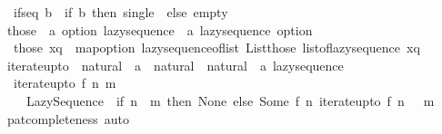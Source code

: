 \begin{isabellebody}
\isanewline
\ \ {\isachardoublequoteopen}if{\isacharunderscore}{\kern0pt}seq\ b\ {\isacharequal}{\kern0pt}\ {\isacharparenleft}{\kern0pt}if\ b\ then\ single\ {\isacharparenleft}{\kern0pt}{\isacharparenright}{\kern0pt}\ else\ empty{\isacharparenright}{\kern0pt}{\isachardoublequoteclose}\isanewline
\isanewline
{}\isamarkupfalse%
\ those\ {\isacharcolon}{\kern0pt}{\isacharcolon}{\kern0pt}\ {\isachardoublequoteopen}{\isacharprime}{\kern0pt}a\ option\ lazy{\isacharunderscore}{\kern0pt}sequence\ {\isasymRightarrow}\ {\isacharprime}{\kern0pt}a\ lazy{\isacharunderscore}{\kern0pt}sequence\ option{\isachardoublequoteclose}\isanewline
{}\isanewline
\ \ {\isachardoublequoteopen}those\ xq\ {\isacharequal}{\kern0pt}\ map{\isacharunderscore}{\kern0pt}option\ lazy{\isacharunderscore}{\kern0pt}sequence{\isacharunderscore}{\kern0pt}of{\isacharunderscore}{\kern0pt}list\ {\isacharparenleft}{\kern0pt}List{\isachardot}{\kern0pt}those\ {\isacharparenleft}{\kern0pt}list{\isacharunderscore}{\kern0pt}of{\isacharunderscore}{\kern0pt}lazy{\isacharunderscore}{\kern0pt}sequence\ xq{\isacharparenright}{\kern0pt}{\isacharparenright}{\kern0pt}{\isachardoublequoteclose}\isanewline
\ \ \isanewline
{}\isamarkupfalse%
\ iterate{\isacharunderscore}{\kern0pt}upto\ {\isacharcolon}{\kern0pt}{\isacharcolon}{\kern0pt}\ {\isachardoublequoteopen}{\isacharparenleft}{\kern0pt}natural\ {\isasymRightarrow}\ {\isacharprime}{\kern0pt}a{\isacharparenright}{\kern0pt}\ {\isasymRightarrow}\ natural\ {\isasymRightarrow}\ natural\ {\isasymRightarrow}\ {\isacharprime}{\kern0pt}a\ lazy{\isacharunderscore}{\kern0pt}sequence{\isachardoublequoteclose}\isanewline
{}\isanewline
\ \ {\isachardoublequoteopen}iterate{\isacharunderscore}{\kern0pt}upto\ f\ n\ m\ {\isacharequal}{\kern0pt}\isanewline
\ \ \ \ Lazy{\isacharunderscore}{\kern0pt}Sequence\ {\isacharparenleft}{\kern0pt}{\isasymlambda}{\isacharunderscore}{\kern0pt}{\isachardot}{\kern0pt}\ if\ n\ {\isachargreater}{\kern0pt}\ m\ then\ None\ else\ Some\ {\isacharparenleft}{\kern0pt}f\ n{\isacharcomma}{\kern0pt}\ iterate{\isacharunderscore}{\kern0pt}upto\ f\ {\isacharparenleft}{\kern0pt}n\ {\isacharplus}{\kern0pt}\ {}{\isacharparenright}{\kern0pt}\ m{\isacharparenright}{\kern0pt}{\isacharparenright}{\kern0pt}{\isachardoublequoteclose}\isanewline
%
\isadelimproof
\ \ %
\endisadelimproof
%
\isatagproof
{}\isamarkupfalse%
\ pat{\isacharunderscore}{\kern0pt}completeness\ auto%
\endisatagproof
{\isafoldproof}%
%
\isadelimproof
\isanewline
%
\endisadelimproof
\isanewline

\end{isabellebody}
